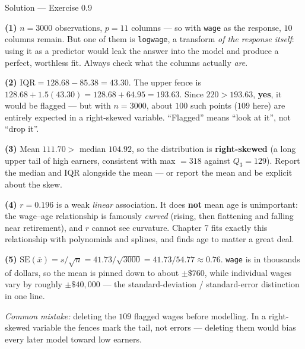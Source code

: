 \documentclass[aspectratio=169,11pt]{beamer}
\begin{document}
\begin{frame}{Solution --- Exercise 0.9}
  \begin{solutionbox}
    \scriptsize
    \textbf{(1)} $n = 3000$ observations, $p = 11$ columns --- so with
    \texttt{wage} as the response, $10$ columns remain. But one of them is
    \texttt{logwage}, a transform \emph{of the response itself}: using it as a
    predictor would leak the answer into the model and produce a perfect,
    worthless fit. Always check what the columns actually \emph{are}.

    \textbf{(2)} $\mathrm{IQR} = 128.68 - 85.38 = 43.30$. The upper fence is
    $128.68 + 1.5(43.30) = 128.68 + 64.95 = 193.63$. Since
    $220 > 193.63$, \textbf{yes}, it would be flagged --- but with $n=3000$,
    about $100$ such points ($109$ here) are entirely expected in a
    right-skewed variable. ``Flagged'' means ``look at it'', not ``drop it''.

    \textbf{(3)} Mean $111.70 >$ median $104.92$, so the distribution is
    \textbf{right-skewed} (a long upper tail of high earners, consistent with
    max $= 318$ against $Q_3 = 129$). Report the median and IQR alongside the
    mean --- or report the mean and be explicit about the skew.

    \textbf{(4)} $r = 0.196$ is a weak \emph{linear} association. It does
    \textbf{not} mean age is unimportant: the wage--age relationship is
    famously \emph{curved} (rising, then flattening and falling near
    retirement), and $r$ cannot see curvature. Chapter 7 fits exactly this
    relationship with polynomials and splines, and finds age to matter a
    great deal.

    \textbf{(5)} $\mathrm{SE}(\bar x) = s/\sqrt n = 41.73/\sqrt{3000}
    = 41.73/54.77 \approx 0.76$. \texttt{wage} is in thousands of dollars, so
    the mean is pinned down to about $\pm\$760$, while individual wages vary
    by roughly $\pm\$40{,}000$ --- the standard-deviation / standard-error
    distinction in one line.

    \smallskip
    \textit{Common mistake:} deleting the $109$ flagged wages before
    modelling. In a right-skewed variable the fences mark the tail, not
    errors --- deleting them would bias every later model toward low earners.
  \end{solutionbox}
\end{frame}
\end{document}
